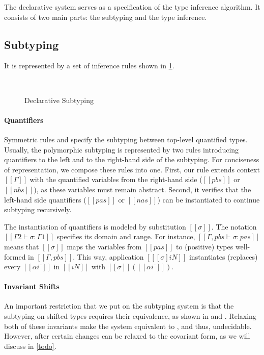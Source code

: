 \label{sec:declarative-system}

The declarative system serves as a specification of the
type inference algorithm. It consists of two main parts:
the subtyping and the type inference. 

\subsection{Subtyping}
It is represented by a set of inference rules shown in
\cref{fig:declarative-subtyping}.

\begin{figure}[h]
  \begin{multicols}{2}
    \ottdefnDOneNsub{}

    \ottdefnDOnePsup{}
  \end{multicols}
  \hfill\\
  \begin{multicols}{2}
    \ottdefnDOneNeq{}

    \ottdefnDOnePeq{}
  \end{multicols}
  \caption{Declarative Subtyping}
  \label{fig:declarative-subtyping}
\end{figure}

\paragraph{Quantifiers}  
Symmetric rules  and 
 specify 
the subtyping between top-level quantified types.
Usually, the polymorphic subtyping is represented by two rules
introducing quantifiers to the left and to the right-hand side of the subtyping.
For conciseness of representation, we compose these rules into one.
First, our rule extends context $[[Γ]]$ with the quantified variables 
from the right-hand side ($[[pbs]]$ or $[[nbs]]$), 
as these variables must remain abstract.
Second, it verifies that the left-hand side quantifiers
($[[pas]]$ or $[[nas]]$) can be instantiated to continue subtyping recursively. 

The instantiation of quantifiers is modeled by substitution $[[σ]]$.
The notation $[[Γ2 ⊢ σ : Γ1]]$ specifies its domain and range.
For instance, $[[Γ, pbs ⊢ σ : {pas}]]$ means that 
$[[σ]]$ maps the variables from $[[pas]]$ to (positive) types
well-formed in $[[Γ, pbs]]$.
This way, application $[[ [σ]iN ]]$ instantiates (replaces) every
$[[αi⁻]]$ in $[[iN]]$ with $[[σ]]([[αi⁻]])$.

\paragraph{Invariant Shifts}
An important restriction that we put on the subtyping system is
that the subtyping on shifted types requires their equivalence,
as shown in  and
. Relaxing both of these
invariants make the system equivalent to \systemf, 
and thus, undecidable. 
However, after certain changes 
 can be relaxed to the covariant form,
 as we will discuss in \cref{todo}.

